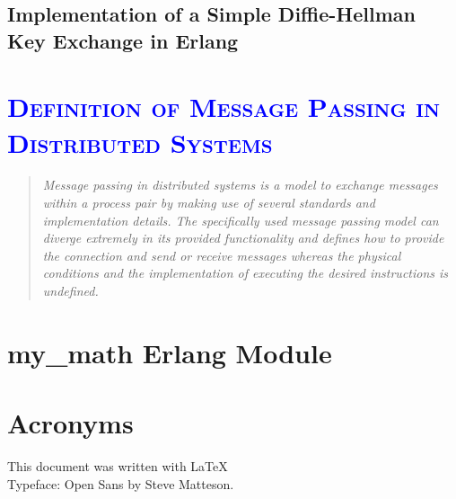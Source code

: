 \documentclass[xcolor=dvipsnames]{article}
\begin{document}
\subsection{Implementation of a Simple Diffie-Hellman Key Exchange in Erlang}



\section{\scshape{\textcolor{blue}{Definition of Message Passing in Distributed Systems}}}

\begin{quote}
\textit{Message passing in distributed systems is a model to exchange messages within a process pair by making use of several standards and implementation details. The specifically used message passing model can diverge extremely in its provided functionality and defines how to provide the connection and send or receive messages whereas the physical conditions and the implementation of executing the desired instructions is undefined.}
\end{quote}

\newpage

\begin{appendix}

\section{my\_math Erlang Module}\label{my_math}



\section{Acronyms}

\printnoidxglossaries

\end{appendix}

\newpage




\vfill
\begin{center}
This document was written with \LaTeX 
\\Typeface: Open Sans by Steve Matteson.
\end{center}

\end{document}
